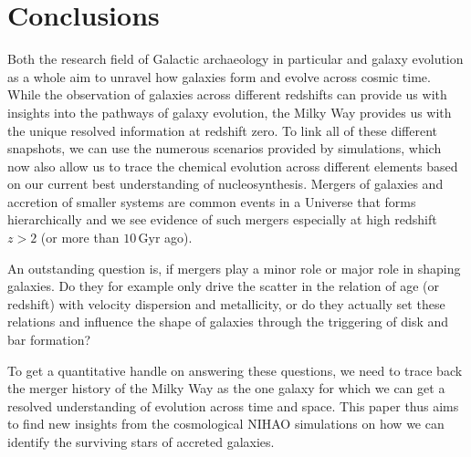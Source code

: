 \documentclass[fleqn,usenatbib]{mnras}
\begin{document}
\section{Conclusions}
\label{sec:conc}

Both the research field of Galactic archaeology in particular and galaxy evolution as a whole aim to unravel how galaxies form and evolve across cosmic time. While the observation of galaxies across different redshifts can provide us with insights into the pathways of galaxy evolution, the Milky Way provides us with the unique resolved information at redshift zero. To link all of these different snapshots, we can use the numerous scenarios provided by simulations, which now also allow us to trace the chemical evolution across different elements based on our current best understanding of nucleosynthesis. Mergers of galaxies and accretion of smaller systems are common events in a Universe that forms hierarchically and we see evidence of such mergers especially at high redshift $z > 2$ (or more than $10\,\mathrm{Gyr}$ ago).

An outstanding question is, if mergers play a minor role or major role in shaping galaxies. Do they for example only drive the scatter in the relation of age (or redshift) with velocity dispersion and metallicity, or do they actually set these relations and influence the shape of galaxies through the triggering of disk and bar formation?

To get a quantitative handle on answering these questions, we need to trace back the merger history of the Milky Way as the one galaxy for which we can get a resolved understanding of evolution across time and space. This paper thus aims to find new insights from the cosmological \textsc{NIHAO} simulations on how we can identify the surviving stars of accreted galaxies.
\end{document}
